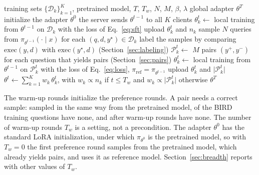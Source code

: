 \begin{algorithm}[!t]
\caption{\method}\label{alg:method}
\begin{algorithmic}[1]
\Require training sets $\{\mathcal{D}_k\}_{k=1}^{K}$, pretrained model,
  $T$, $T_w$, $N$, $M$, $\beta$, $\lambda$
\Ensure global adapter $\theta^{T}$
\State initialize the adapter $\theta^{0}$
  \State the server sends $\theta^{t-1}$ to all $K$ clients
     
      \State $\theta_k^{t} \gets$ local training from $\theta^{t-1}$ on
        $\mathcal{D}_k$ with the loss of Eq.~\eqref{eq:sft}
      \State upload $\theta_k^{t}$ and $n_k$
    \Else {}
      \State sample $N$ queries from $\pi_{\theta^{t-1}}(\cdot \mid x)$
        for each $(q, d, y^\star) \in \mathcal{D}_k$
      \State label the samples by comparing $\mathrm{exec}(y, d)$
        with $\mathrm{exec}(y^\star, d)$
        (Section~\ref{sec:labeling})
      \State $\mathcal{P}_k^{t} \gets$ $M$ pairs $(y^{+}, y^{-})$ for
        each question that yields pairs (Section~\ref{sec:pairs})
        \State $\theta_k^{t} \gets$ local training from $\theta^{t-1}$
          on $\mathcal{P}_k^{t}$ with the loss of Eq.~\eqref{eq:loss},
          $\pi_{\mathrm{ref}} = \pi_{\theta^{t-1}}$
        \State upload $\theta_k^{t}$ and $\lvert\mathcal{P}_k^{t}\rvert$
      \EndIf
    \EndIf
  \EndFor
  \State $\theta^{t} \gets \sum_{k=1}^{K} w_k \, \theta_k^{t}$, with
    $w_k \propto n_k$ if $t \le T_w$ and
    $w_k \propto \lvert\mathcal{P}_k^{t}\rvert$ otherwise
\EndFor
\State \Return $\theta^{T}$
\end{algorithmic}
\end{algorithm}

The warm-up rounds initialize the preference rounds. A pair needs a
correct sample: sampled in the same way from the pretrained model,
 of the 
BIRD training questions have none, and after 
warm-up rounds  have none. The number of
warm-up rounds $T_w$ is a setting, not a precondition. The adapter
$\theta^{0}$ has the standard LoRA initialization, under which
$\pi_{\theta^{0}}$ is the pretrained model, so with $T_w = 0$ the first
preference round samples from the pretrained model, which already yields
pairs, and uses it as reference model. Section~\ref{sec:breadth} reports
\method{} with other values of $T_w$.

